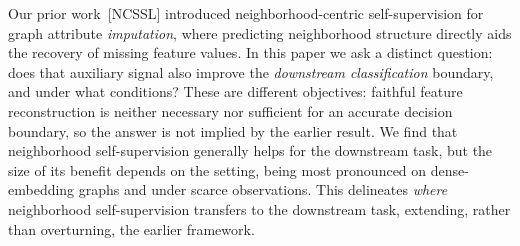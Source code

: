 Our prior work~[NCSSL] introduced neighborhood-centric self-supervision for graph attribute \emph{imputation}, where predicting neighborhood structure directly aids the recovery of missing feature values. In this paper we ask a distinct question: does that auxiliary signal also improve the \emph{downstream classification} boundary, and under what conditions? These are different objectives: faithful feature reconstruction is neither necessary nor sufficient for an accurate decision boundary, so the answer is not implied by the earlier result. We find that neighborhood self-supervision generally helps for the downstream task, but the size of its benefit depends on the setting, being most pronounced on dense-embedding graphs and under scarce observations. This delineates \emph{where} neighborhood self-supervision transfers to the downstream task, extending, rather than overturning, the earlier framework.
